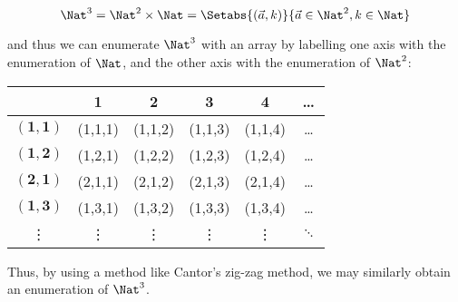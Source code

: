\documentclass[../../include/open-logic-section]{subfiles}
\begin{document}
\begin{explain}
\[ \Nat^3 = \Nat^2 \times \Nat = \Setabs{(\vec a, 
k)}{\vec a \in \Nat^2, k \in \Nat } \]

and thus we can enumerate $\Nat^3$ with an array by 
labelling one axis with the enumeration of $\Nat$, and the 
other axis with the enumeration of $\Nat^2$:

\center
\begin{tabular}{| c | c | c | c | c | c}
\hline
& \textbf 1 & \textbf 2 & \textbf 3 & \textbf 4 & \dots \\
\hline
$\mathbf{(1,1)}$ & (1,1,1) & (1,1,2) & (1,1,3) & (1,1,4) & \dots \\
\hline
$\mathbf{(1,2)}$ & (1,2,1) & (1,2,2) & (1,2,3) & (1,2,4) & \dots \\
\hline
$\mathbf{(2,1)}$ & (2,1,1) & (2,1,2) & (2,1,3) & (2,1,4) & \dots \\
\hline
$\mathbf{(1,3)}$ & (1,3,1) & (1,3,2) & (1,3,3) & (1,3,4) & \dots\\
\hline
\vdots & \vdots & \vdots & \vdots & \vdots & $\ddots$ \\
\end{tabular}

\flushleft
Thus, by using a method like Cantor's zig-zag method, we may 
similarly obtain an enumeration of $\Nat^3$. 

\end{explain}
\end{document}
